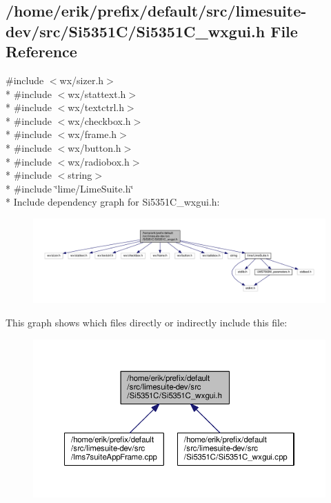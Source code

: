 \subsection{/home/erik/prefix/default/src/limesuite-\/dev/src/\+Si5351\+C/\+Si5351\+C\+\_\+wxgui.h File Reference}
\label{Si5351C__wxgui_8h}
{\ttfamily \#include $<$wx/sizer.\+h$>$}\\*
{\ttfamily \#include $<$wx/stattext.\+h$>$}\\*
{\ttfamily \#include $<$wx/textctrl.\+h$>$}\\*
{\ttfamily \#include $<$wx/checkbox.\+h$>$}\\*
{\ttfamily \#include $<$wx/frame.\+h$>$}\\*
{\ttfamily \#include $<$wx/button.\+h$>$}\\*
{\ttfamily \#include $<$wx/radiobox.\+h$>$}\\*
{\ttfamily \#include $<$string$>$}\\*
{\ttfamily \#include \char`\"{}lime/\+Lime\+Suite.\+h\char`\"{}}\\*
Include dependency graph for Si5351\+C\+\_\+wxgui.\+h\+:
\nopagebreak
\begin{figure}[H]
\begin{center}
\leavevmode
\includegraphics[width=350pt]{de/d98/Si5351C__wxgui_8h__incl}
\end{center}
\end{figure}
This graph shows which files directly or indirectly include this file\+:
\nopagebreak
\begin{figure}[H]
\begin{center}
\leavevmode
\includegraphics[width=350pt]{d5/dce/Si5351C__wxgui_8h__dep__incl}
\end{center}
\end{figure}
